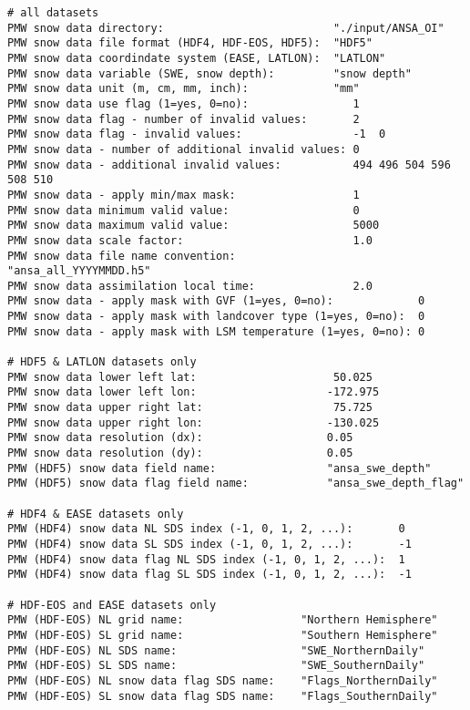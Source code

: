 \begin{Verbatim}[frame=single]
# all datasets
PMW snow data directory:                          "./input/ANSA_OI"
PMW snow data file format (HDF4, HDF-EOS, HDF5):  "HDF5"
PMW snow data coordindate system (EASE, LATLON):  "LATLON"
PMW snow data variable (SWE, snow depth):         "snow depth"
PMW snow data unit (m, cm, mm, inch):             "mm"
PMW snow data use flag (1=yes, 0=no):                1
PMW snow data flag - number of invalid values:       2
PMW snow data flag - invalid values:                 -1  0
PMW snow data - number of additional invalid values: 0
PMW snow data - additional invalid values:           494 496 504 596 508 510
PMW snow data - apply min/max mask:                  1 
PMW snow data minimum valid value:                   0
PMW snow data maximum valid value:                   5000 
PMW snow data scale factor:                          1.0 
PMW snow data file name convention:                  "ansa_all_YYYYMMDD.h5"
PMW snow data assimilation local time:               2.0
PMW snow data - apply mask with GVF (1=yes, 0=no):             0
PMW snow data - apply mask with landcover type (1=yes, 0=no):  0
PMW snow data - apply mask with LSM temperature (1=yes, 0=no): 0

# HDF5 & LATLON datasets only
PMW snow data lower left lat:                     50.025
PMW snow data lower left lon:                    -172.975
PMW snow data upper right lat:                    75.725
PMW snow data upper right lon:                   -130.025
PMW snow data resolution (dx):                   0.05
PMW snow data resolution (dy):                   0.05
PMW (HDF5) snow data field name:                 "ansa_swe_depth" 
PMW (HDF5) snow data flag field name:            "ansa_swe_depth_flag"

# HDF4 & EASE datasets only
PMW (HDF4) snow data NL SDS index (-1, 0, 1, 2, ...):       0
PMW (HDF4) snow data SL SDS index (-1, 0, 1, 2, ...):       -1
PMW (HDF4) snow data flag NL SDS index (-1, 0, 1, 2, ...):  1
PMW (HDF4) snow data flag SL SDS index (-1, 0, 1, 2, ...):  -1

# HDF-EOS and EASE datasets only
PMW (HDF-EOS) NL grid name:                  "Northern Hemisphere"
PMW (HDF-EOS) SL grid name:                  "Southern Hemisphere"
PMW (HDF-EOS) NL SDS name:                   "SWE_NorthernDaily"
PMW (HDF-EOS) SL SDS name:                   "SWE_SouthernDaily"  
PMW (HDF-EOS) NL snow data flag SDS name:    "Flags_NorthernDaily"
PMW (HDF-EOS) SL snow data flag SDS name:    "Flags_SouthernDaily"
 \end{Verbatim}


